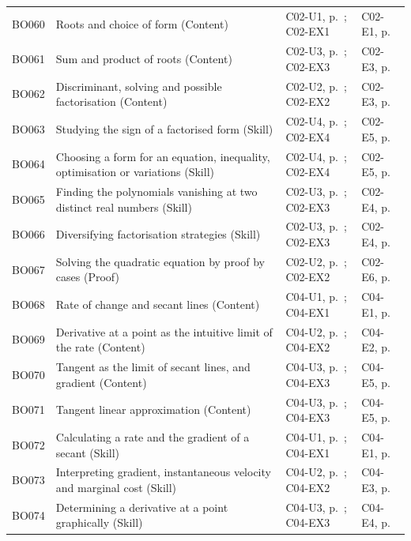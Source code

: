 \begin{longtable}{p{.1\linewidth}p{.43\linewidth}p{.19\linewidth}p{.16\linewidth}}
BO060 & Roots and choice of form (Content) & C02-U1, p.\,\pageref{C02-U1} ; C02-EX1 & C02-E1, p.\,\pageref{C02-E1} \\
BO061 & Sum and product of roots (Content) & C02-U3, p.\,\pageref{C02-U3} ; C02-EX3 & C02-E3, p.\,\pageref{C02-E3} \\
BO062 & Discriminant, solving and possible factorisation (Content) & C02-U2, p.\,\pageref{C02-U2} ; C02-EX2 & C02-E3, p.\,\pageref{C02-E3} \\
BO063 & Studying the sign of a factorised form (Skill) & C02-U4, p.\,\pageref{C02-U4} ; C02-EX4 & C02-E5, p.\,\pageref{C02-E5} \\
BO064 & Choosing a form for an equation, inequality, optimisation or variations (Skill) & C02-U4, p.\,\pageref{C02-U4} ; C02-EX4 & C02-E5, p.\,\pageref{C02-E5} \\
BO065 & Finding the polynomials vanishing at two distinct real numbers (Skill) & C02-U3, p.\,\pageref{C02-U3} ; C02-EX3 & C02-E4, p.\,\pageref{C02-E4} \\
BO066 & Diversifying factorisation strategies (Skill) & C02-U3, p.\,\pageref{C02-U3} ; C02-EX3 & C02-E4, p.\,\pageref{C02-E4} \\
BO067 & Solving the quadratic equation by proof by cases (Proof) & C02-U2, p.\,\pageref{C02-U2} ; C02-EX2 & C02-E6, p.\,\pageref{C02-E6} \\
BO068 & Rate of change and secant lines (Content) & C04-U1, p.\,\pageref{C04-U1} ; C04-EX1 & C04-E1, p.\,\pageref{C04-E1} \\
BO069 & Derivative at a point as the intuitive limit of the rate (Content) & C04-U2, p.\,\pageref{C04-U2} ; C04-EX2 & C04-E2, p.\,\pageref{C04-E2} \\
BO070 & Tangent as the limit of secant lines, and gradient (Content) & C04-U3, p.\,\pageref{C04-U3} ; C04-EX3 & C04-E5, p.\,\pageref{C04-E5} \\
BO071 & Tangent linear approximation (Content) & C04-U3, p.\,\pageref{C04-U3} ; C04-EX3 & C04-E5, p.\,\pageref{C04-E5} \\
BO072 & Calculating a rate and the gradient of a secant (Skill) & C04-U1, p.\,\pageref{C04-U1} ; C04-EX1 & C04-E1, p.\,\pageref{C04-E1} \\
BO073 & Interpreting gradient, instantaneous velocity and marginal cost (Skill) & C04-U2, p.\,\pageref{C04-U2} ; C04-EX2 & C04-E3, p.\,\pageref{C04-E3} \\
BO074 & Determining a derivative at a point graphically (Skill) & C04-U3, p.\,\pageref{C04-U3} ; C04-EX3 & C04-E4, p.\,\pageref{C04-E4} \\

\end{longtable}

